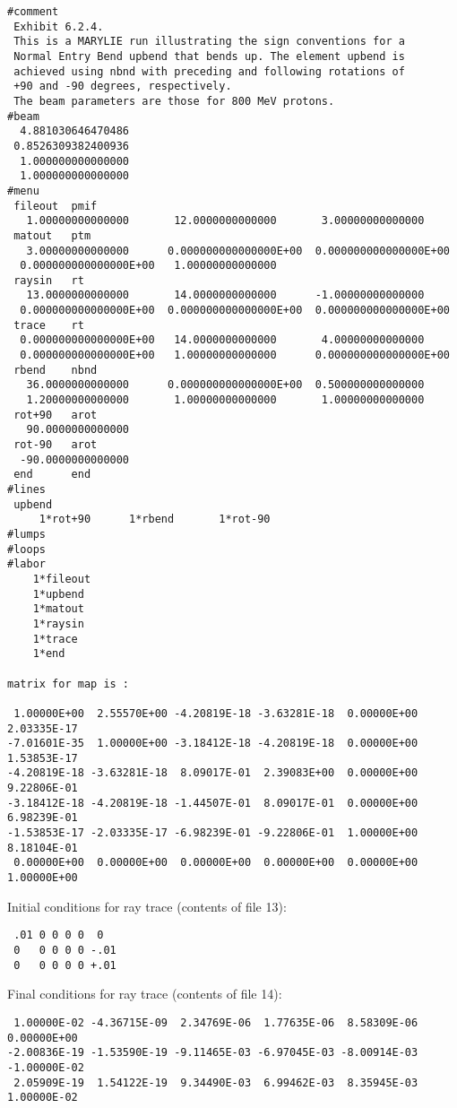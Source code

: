 \newpage
\begin{footnotesize}
\begin{verbatim}
#comment
 Exhibit 6.2.4.
 This is a MARYLIE run illustrating the sign conventions for a
 Normal Entry Bend upbend that bends up. The element upbend is
 achieved using nbnd with preceding and following rotations of
 +90 and -90 degrees, respectively.
 The beam parameters are those for 800 MeV protons.
#beam
  4.881030646470486
 0.8526309382400936
  1.000000000000000
  1.000000000000000
#menu
 fileout  pmif
   1.00000000000000       12.0000000000000       3.00000000000000
 matout   ptm
   3.00000000000000      0.000000000000000E+00  0.000000000000000E+00
  0.000000000000000E+00   1.00000000000000
 raysin   rt
   13.0000000000000       14.0000000000000      -1.00000000000000
  0.000000000000000E+00  0.000000000000000E+00  0.000000000000000E+00
 trace    rt
  0.000000000000000E+00   14.0000000000000       4.00000000000000
  0.000000000000000E+00   1.00000000000000      0.000000000000000E+00
 rbend    nbnd
   36.0000000000000      0.000000000000000E+00  0.500000000000000
   1.20000000000000       1.00000000000000       1.00000000000000
 rot+90   arot
   90.0000000000000
 rot-90   arot
  -90.0000000000000
 end      end
#lines
 upbend
     1*rot+90      1*rbend       1*rot-90
#lumps
#loops
#labor
    1*fileout
    1*upbend
    1*matout
    1*raysin
    1*trace
    1*end

matrix for map is :

 1.00000E+00  2.55570E+00 -4.20819E-18 -3.63281E-18  0.00000E+00  2.03335E-17
-7.01601E-35  1.00000E+00 -3.18412E-18 -4.20819E-18  0.00000E+00  1.53853E-17
-4.20819E-18 -3.63281E-18  8.09017E-01  2.39083E+00  0.00000E+00  9.22806E-01
-3.18412E-18 -4.20819E-18 -1.44507E-01  8.09017E-01  0.00000E+00  6.98239E-01
-1.53853E-17 -2.03335E-17 -6.98239E-01 -9.22806E-01  1.00000E+00  8.18104E-01
 0.00000E+00  0.00000E+00  0.00000E+00  0.00000E+00  0.00000E+00  1.00000E+00
\end{verbatim}
\end{footnotesize}
Initial conditions for ray trace (contents of file 13):
\begin{footnotesize}
\begin{verbatim}
 .01 0 0 0 0  0
 0   0 0 0 0 -.01
 0   0 0 0 0 +.01
\end{verbatim}
\end{footnotesize}
Final conditions for ray trace (contents of file 14):
\begin{footnotesize}
\begin{verbatim}
 1.00000E-02 -4.36715E-09  2.34769E-06  1.77635E-06  8.58309E-06  0.00000E+00
-2.00836E-19 -1.53590E-19 -9.11465E-03 -6.97045E-03 -8.00914E-03 -1.00000E-02
 2.05909E-19  1.54122E-19  9.34490E-03  6.99462E-03  8.35945E-03  1.00000E-02
\end{verbatim}
\end{footnotesize}

